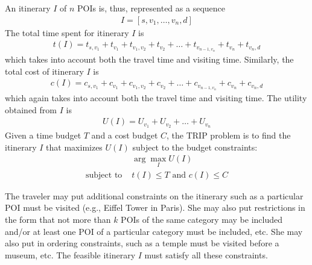 An itinerary $I$ of $n$ POIs is, thus, represented as a sequence
%
\begin{align}
	I = [ s, v_1, \dots, v_n, d ]
\end{align}
%
The total time spent for itinerary $I$ is
%
\begin{align}
	t(I) = t_{s,v_1} + t_{v_1} + t_{v_1,v_2} + t_{v_2} + \dots + t_{v_{n-1,v_n}} + t_{v_n} + t_{v_n,d}
\end{align}
%
which takes into account both the travel time and visiting time.  Similarly,
the total cost of itinerary $I$ is 
%
\begin{align}
	c(I) = c_{s,v_1} + c_{v_1} + c_{v_1,v_2} + c_{v_2} + \dots + c_{v_{n-1,v_n}} + c_{v_n} + c_{v_n,d}
\end{align}
%
which again takes into account both the travel time and visiting time.  The
utility obtained from $I$ is
%
\begin{align}
	U(I) = U_{v_1} + U_{v_2} + \dots + U_{v_n}
\end{align}
%
Given a time budget $T$ and a cost budget $C$, the TRIP problem is to find the
itinerary $I$ that maximizes $U(I)$ subject to the budget constraints:
%
\begin{align}
	& \arg\max_I U(I) \\
	\text{subject to } & t(I) \leq T \text{ and } c(I) \leq C
\end{align}

The traveler may put additional constraints on the itinerary such as
a particular POI must be visited (e.g., Eiffel Tower in Paris).  She
may also put restrictions in the form that not more than $k$ POIs of
the same category may be included and/or at least one POI of a particular
category must be included, etc.  She may also put in ordering
constraints, such as a temple must be visited before a museum, etc.  The feasible itinerary $I$ must satisfy all these
constraints.

